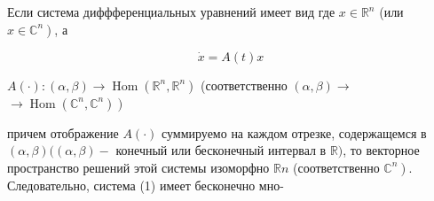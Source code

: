 \documentclass[10pt]{article}
\begin{document}
Если система диффференциальных уравнений имеет вид где $x \in \mathbb{R}^{n}$ (или $\left.x \in \mathbb{C}^{n}\right)$, а



\[

\dot{x}=A(t) x

\]



$A(\cdot):(\alpha, \beta) \rightarrow \operatorname{Hom}\left(\mathbb{R}^{n}, \mathbb{R}^{n}\right)$ (соответственно $(\alpha, \beta) \rightarrow$ $\left.\longrightarrow \operatorname{Hom}\left(\mathbb{C}^{n}, \mathbb{C}^{n}\right)\right)$



причем отображение $A(\cdot)$ суммируемо на каждом отрезке, содержащемся в $(\alpha, \beta)((\alpha, \beta)-$ конечный или бесконечный интервал в $\mathbb{R})$, то векторное пространство решений этой системы изоморфно $\mathbb{R} n$ (соответственно $\left.\mathbb{C}^{n}\right)$. Следовательно, система (1) имеет бесконечно мно-
\end{document}
